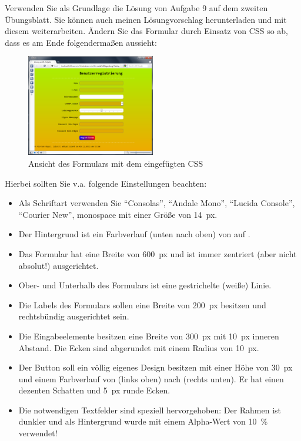 %
\par Verwenden Sie als Grundlage die Lösung von Aufgabe 9 auf dem zweiten Übungsblatt. Sie können auch meinen Lösungvorschlag herunterladen und mit diesem weiterarbeiten. Ändern Sie das Formular durch Einsatz von CSS so ab, dass es am Ende folgendermaßen aussieht:
%
\begin{figure}[!h]
\centering
\includegraphics[width=0.5\textwidth]{Figures/form.png}
\caption{Ansicht des Formulars mit dem eingefügten CSS}
\label{fig:form}
\end{figure}
%
\par Hierbei sollten Sie v.a. folgende Einstellungen beachten:
%
\begin{itemize}
\item Als Schriftart verwenden Sie ``Consolas'', ``Andale Mono'', ``Lucida Console'', ``Courier New'', monospace mit einer Größe von \qty{14}{px}.
\item Der Hintergrund ist ein Farbverlauf (unten nach oben) von  auf .
\item Das Formular hat eine Breite von \qty{600}{px} und ist immer zentriert (aber nicht absolut!) ausgerichtet.
\item Ober- und Unterhalb des Formulars ist eine gestrichelte (weiße) Linie.
\item Die Labels des Formulars sollen eine Breite von \qty{200}{px} besitzen und rechtsbündig ausgerichtet sein.
\item Die Eingabeelemente besitzen eine Breite von \qty{300}{px} mit \qty{10}{px} inneren Abstand. Die Ecken sind abgerundet mit einem Radius von \qty{10}{px}.
\item Der Button soll ein völlig eigenes Design besitzen mit einer Höhe von \qty{30}{px} und einem Farbverlauf von  (links oben) nach  (rechts unten). Er hat einen dezenten Schatten und \qty{5}{px} runde Ecken.
\item Die notwendigen Textfelder sind speziell hervorgehoben: Der Rahmen ist dunkler und als Hintergrund wurde  mit einem Alpha-Wert von \qty{10}{\%} verwendet!
\end{itemize}